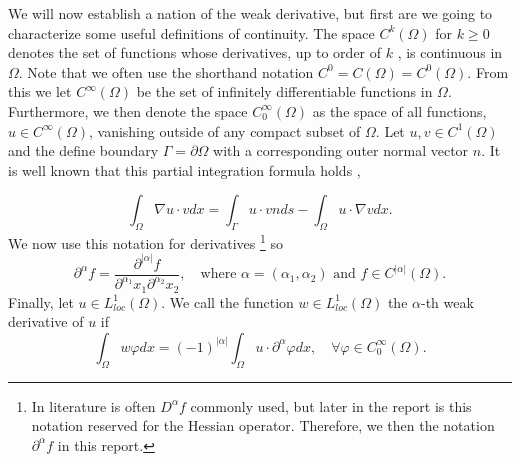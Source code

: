 We will now establish a nation of the weak derivative, but first are we going to characterize some useful definitions of continuity. The space $C^{k}\left( \Omega  \right) $ for $k\ge 0$ denotes the set of functions whose derivatives, up to order of
$k$ , is continuous in $\Omega $. Note that we often use the shorthand notation $ C^{0} = C\left( \Omega  \right)  = C^{0}\left( \Omega  \right) $.
From this we let $C^{\infty}\left( \Omega  \right) $ be the set of infinitely differentiable functions in $\Omega $. Furthermore, we then denote the space $C^{\infty}_{0}\left( \Omega  \right)$ as the space of all functions, $u \in C^{\infty}\left( \Omega
\right) $, vanishing outside of any compact subset of $\Omega $. Let $u,v \in  C^{1}\left( \Omega  \right) $ and the define boundary $\Gamma  = \partial \Omega $ with a corresponding outer normal vector $n$. It is well known that this partial
integration formula holds \cite{manzoni2021optimal},

\[
\int_{\Omega }^{} \nabla u \cdot v dx = \int_{\Gamma }^{} u\cdot v n ds - \int_{\Omega }^{} u \cdot \nabla v dx.
\]
We now use this notation for derivatives
\footnote{In literature is often $D^{\alpha } f$ commonly used, but later in the report is this notation reserved for the Hessian operator. Therefore, we then the notation $\partial ^{\alpha } f$ in this report.} so
\begin{equation}
\label{eq:mixed_derivative}
\partial ^{\alpha  } f = \frac{\partial ^{\left\lvert \alpha  \right\rvert } f}{ \partial ^{\alpha _{1} } x_{1} \partial ^{\alpha _{2}} x_{2}  }, \quad \text{where } \alpha=\left( \alpha _{1}, \alpha _{2} \right) \text{ and } f \in C^{\left\lvert \alpha  \right\rvert }
\left( \Omega  \right)
.\end{equation}
Finally, let $u \in  L^{1}_{loc}\left( \Omega  \right) $. We call the function $w \in L_{loc}^{1}\left( \Omega  \right) $ the $\alpha $-th weak derivative of $u$  if \[
\int_{\Omega }^{} w \varphi  dx = \left( -1 \right) ^{\left\lvert \alpha  \right\rvert } \int_{\Omega }^{} u \cdot \partial ^{\alpha } \varphi dx, \quad \forall \varphi \in  C_{0}^{\infty}\left( \Omega  \right).
\]

